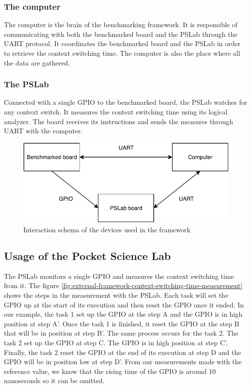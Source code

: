 \subsubsection{The computer}
The computer is the brain of the benchmarking framework.
It is responsible of communicating with both the benchmarked board and the PSLab through the UART protocol.
It coordinates the benchmarked board and the PSLab in order to retrieve the context switching time.
The computer is also the place where all the data are gathered.

\subsubsection{The PSLab}
Connected with a single GPIO to the benchmarked board, the PSLab watches for any context switch.
It measures the context switching time using its logical analyzer.
The board receives its instructions and sends the measures through UART with the computer.

\begin{figure}[!ht]
  \centering
  \includegraphics[scale=1]{assets/external-benchmarking-framework-schema.pdf}
  \caption{\label{fig:external-benchmarking-framework-schema}Interaction schema of the devices used in the framework}
\end{figure}

\subsection{Usage of the Pocket Science Lab}

The PSLab monitors a single GPIO and measures the context switching time from it.
The figure \ref{fig:external-framework-context-switching-time-measurement} shows the steps in the measurement with the PSLab.
Each task will set the GPIO up at the start of its execution and then reset the GPIO once it ended.
In our example, the task 1 set up the GPIO at the step A and the GPIO is in high position at step A'.
Once the task 1 is finished, it reset the GPIO at the step B that will be in position at step B'.
The same process occurs for the task 2.
The task 2 set up the GPIO at step C.
The GPIO is in high position at step C'.
Finally, the task 2 reset the GPIO at the end of its execution at step D and the GPIO will be in position low at step D'.
From our measurements made with the reference value, we know that the rising time of the GPIO is around 10 nanoseconds so it can be omitted.

